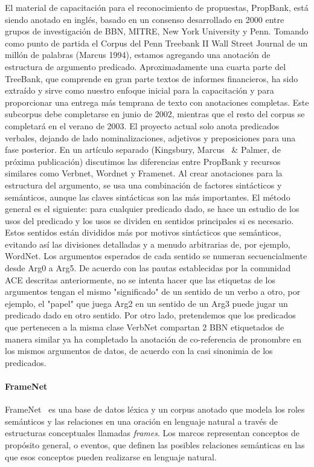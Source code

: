 El material de capacitación para el reconocimiento de propuestas, PropBank, está siendo anotado en inglés, basado en un consenso desarrollado en 2000 entre grupos de investigación de BBN, MITRE, New York University y Penn. Tomando como punto de partida el Corpus del Penn Treebank II Wall Street Journal de un millón de palabras (Marcus 1994), estamos agregando una anotación de estructura de argumento predicado. Aproximadamente una cuarta parte del TreeBank, que comprende en gran parte textos de informes financieros, ha sido extraído y sirve como nuestro enfoque inicial para la capacitación y para proporcionar una entrega más temprana de texto con anotaciones completas. Este subcorpus debe completarse en junio de 2002, mientras que el resto del corpus se completará en el verano de 2003. El proyecto actual solo anota predicados verbales, dejando de lado nominalizaciones, adjetivos y preposiciones para una fase posterior. En un artículo separado (Kingsbury, Marcus \ & Palmer, de próxima publicación) discutimos las diferencias entre PropBank y recursos similares como Verbnet, Wordnet y Framenet. Al crear anotaciones para la estructura del argumento, se usa una combinación de factores sintácticos y semánticos, aunque las claves sintácticas son las más importantes. El método general es el siguiente: para cualquier predicado dado, se hace un estudio de los usos del predicado y los usos se dividen en sentidos principales si es necesario. Estos sentidos están divididos más por motivos sintácticos que semánticos, evitando así las divisiones detalladas y a menudo arbitrarias de, por ejemplo, WordNet. Los argumentos esperados de cada sentido se numeran secuencialmente desde Arg0 a Arg5. De acuerdo con las pautas establecidas por la comunidad ACE descritas anteriormente, no se intenta hacer que las etiquetas de los argumentos tengan el mismo "significado" de un sentido de un verbo a otro, por ejemplo, el "papel" que juega Arg2 en un sentido de un Arg3 puede jugar un predicado dado en otro sentido. Por otro lado, pretendemos que los predicados que pertenecen a la misma clase VerbNet compartan 2 BBN etiquetados de manera similar ya ha completado la anotación de co-referencia de pronombre en los mismos argumentos de datos, de acuerdo con la casi sinonimia de los predicados.

\paragraph{FrameNet}

FrameNet~\cite{framenet} es una base de datos léxica y un corpus anotado que modela los roles semánticos y las relaciones en una oración en lenguaje natural a través de estructuras conceptuales llamadas \textit{frames}. Los marcos representan conceptos de propósito general, o eventos, que definen las posibles relaciones semánticas en las que esos conceptos pueden realizarse en lenguaje natural.

